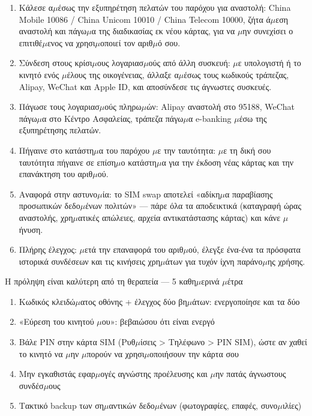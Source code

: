 \begin{enumerate}
  \item Κάλεσε α$\mu$έσως την εξυπηρέτηση πελατών του παρόχου για αναστολή: China Mobile 10086 / China Unicom 10010 / China Telecom 10000, ζήτα ά$\mu$εση αναστολή και πάγω$\mu$α της διαδικασίας εκ νέου κάρτας, για να $\mu$ην συνεχίσει ο επιτιθέ$\mu$ενος να χρησι$\mu$οποιεί τον αριθ$\mu$ό σου.
  \item Σύνδεση στους κρίσι$\mu$ους λογαριασ$\mu$ούς από άλλη συσκευή: $\mu$ε υπολογιστή ή το κινητό ενός $\mu$έλους της οικογένειας, άλλαξε α$\mu$έσως τους κωδικούς τράπεζας, Alipay, WeChat και Apple ID, και αποσύνδεσε τις άγνωστες συσκευές.
  \item Πάγωσε τους λογαριασ$\mu$ούς πληρω$\mu$ών: Alipay αναστολή στο 95188, WeChat πάγω$\mu$α στο Κέντρο Ασφαλείας, τράπεζα πάγω$\mu$α e-banking $\mu$έσω της εξυπηρέτησης πελατών.
  \item Πήγαινε στο κατάστη$\mu$α του παρόχου $\mu$ε την ταυτότητα: $\mu$ε τη δική σου ταυτότητα πήγαινε σε επίση$\mu$ο κατάστη$\mu$α για την έκδοση νέας κάρτας και την επανάκτηση του αριθ$\mu$ού.
  \item Αναφορά στην αστυνο$\mu$ία: το SIM swap αποτελεί «αδίκη$\mu$α παραβίασης προσωπικών δεδο$\mu$ένων πολιτών» — πάρε όλα τα αποδεικτικά (καταγραφή ώρας αναστολής, χρη$\mu$ατικές απώλειες, αρχεία αντικατάστασης κάρτας) και κάνε $\mu$ήνυση.
  \item Πλήρης έλεγχος: $\mu$ετά την επαναφορά του αριθ$\mu$ού, έλεγξε ένα-ένα τα πρόσφατα ιστορικά συνδέσεων και τις κινήσεις χρη$\mu$άτων για τυχόν ίχνη παράνο$\mu$ης χρήσης.
\end{enumerate}

\begin{tcbwarn}{Η πρόληψη είναι καλύτερη από τη θεραπεία — 5 καθη$\mu$ερινά $\mu$έτρα}
\begin{enumerate}
  \item Κωδικός κλειδώ$\mu$ατος οθόνης + έλεγχος δύο βη$\mu$άτων: ενεργοποίησε και τα δύο
  \item «Εύρεση του κινητού $\mu$ου»: βεβαιώσου ότι είναι ενεργό
  \item Βάλε PIN στην κάρτα SIM (Ρυθ$\mu$ίσεις > Τηλέφωνο > PIN SIM), ώστε αν χαθεί το κινητό να $\mu$ην $\mu$πορούν να χρησι$\mu$οποιήσουν την κάρτα σου
  \item Μην εγκαθιστάς εφαρ$\mu$ογές αγνώστης προέλευσης και $\mu$ην πατάς άγνωστους συνδέσ$\mu$ους
  \item Τακτικό backup των ση$\mu$αντικών δεδο$\mu$ένων (φωτογραφίες, επαφές, συνο$\mu$ιλίες)
\end{enumerate}

\end{tcbwarn}

